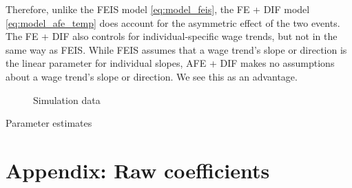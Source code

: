Therefore, unlike the FEIS model \ref{eq:model_feis}, the FE + DIF model  \ref{eq:model_afe_temp} does account for the asymmetric effect of the two events.  The FE + DIF also controls for individual-specific wage trends, but not in the same way as FEIS.  While FEIS assumes that a wage trend's slope or direction is the linear parameter for individual slopes, AFE + DIF makes no assumptions about a wage trend's slope or direction.  We see this as an advantage.  


\begin{figure}
    \caption{Simulation data}
    \label{graph_compare_models_simulation_paper}
\end{figure}

\begin{table}[!h]
    \caption{Parameter estimates}
    \centering
    \resizebox{\textwidth}{!}{}
    \label{table_compare_models_simulation_paper}
\end{table}


\clearpage
\section{Appendix: Raw coefficients}\label{sec:coefficients}
\setcounter{table}{0}
\setcounter{figure}{0}
\renewcommand*\thetable{\Alph{section}.\arabic{table}}
\renewcommand*\thefigure{\Alph{section}.\arabic{figure}}
\renewcommand{\theHfigure}{\Alph{section}.\arabic{table}}
\renewcommand{\theHtable}{\Alph{section}.\arabic{figure}}

